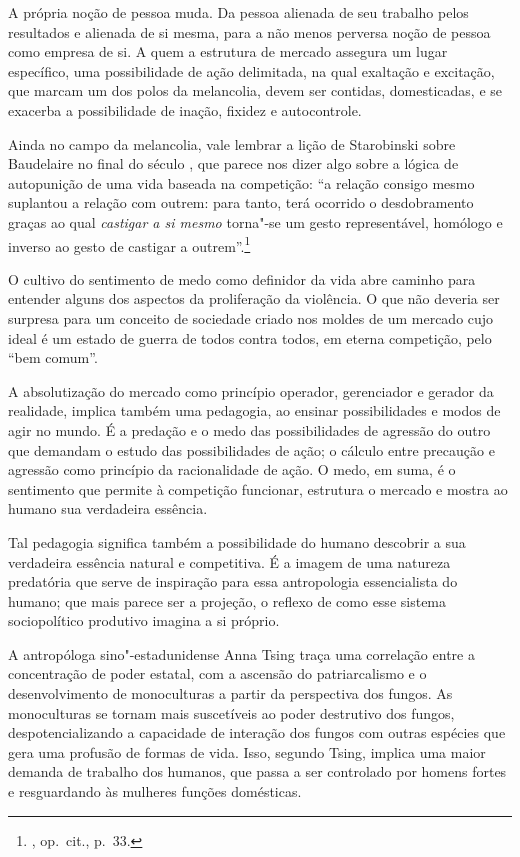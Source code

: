 A própria noção de pessoa muda. Da pessoa alienada de seu trabalho pelos
resultados e alienada de si mesma, para a não menos perversa noção de
pessoa como empresa de si. A quem a estrutura de mercado assegura
um lugar específico, uma possibilidade de ação delimitada, na qual
exaltação e excitação, que marcam um dos polos da melancolia, devem ser
contidas, domesticadas, e se exacerba a possibilidade de inação, fixidez
e autocontrole.

Ainda no campo da melancolia, vale lembrar a lição de Starobinski sobre
Baudelaire no final do século , que parece nos dizer algo sobre a
lógica de autopunição de uma vida baseada na competição: ``a relação
consigo mesmo suplantou a relação com outrem: para tanto, terá ocorrido
o desdobramento graças ao qual \emph{castigar a si mesmo} torna"-se um
gesto representável, homólogo e inverso ao gesto de castigar a
outrem''.\footnote{, op.~cit., p.~33.}

O cultivo do sentimento de medo como definidor da vida abre caminho
para entender alguns dos aspectos da proliferação da violência. O que
não deveria ser surpresa para um conceito de sociedade criado nos
moldes de um mercado cujo ideal é um estado de guerra de todos contra
todos, em eterna competição, pelo ``bem comum''.

\asterisc

A absolutização do mercado como princípio operador, gerenciador e
gerador da realidade, implica também uma pedagogia, ao ensinar
possibilidades e modos de agir no mundo. É a predação e o medo das
possibilidades de agressão do outro que demandam o estudo das
possibilidades de ação; o cálculo entre precaução e agressão como
princípio da racionalidade de ação. O medo, em suma, é o sentimento que
permite à competição funcionar, estrutura o mercado e mostra ao humano
sua verdadeira essência.

Tal pedagogia significa também a possibilidade do humano descobrir a sua
verdadeira essência natural e competitiva. É a imagem de uma natureza
predatória que serve de inspiração para essa antropologia essencialista
do humano; que mais parece ser a projeção, o reflexo de como esse
sistema sociopolítico produtivo imagina a si próprio.

A antropóloga sino"-estadunidense Anna Tsing traça uma correlação entre a
concentração de poder estatal, com a ascensão do patriarcalismo e o %
desenvolvimento de monoculturas a partir da perspectiva dos fungos. As
monoculturas se tornam mais suscetíveis ao poder destrutivo dos fungos,
despotencializando a capacidade de interação dos fungos com outras
espécies que gera uma profusão de formas de vida. Isso, segundo Tsing,
implica uma maior demanda de trabalho dos humanos, que passa a ser
controlado por homens fortes e resguardando às mulheres funções
domésticas.

